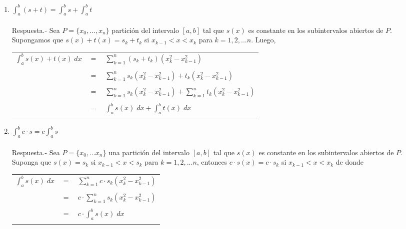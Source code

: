 \begin{enumerate}[ \bfseries 1.]
\begin{enumerate}[\bfseries (a)]
	\item $\displaystyle\int_{a}^{b} (s+t)=\int_{a}^{b} s + \int_{a}^{b} t$\\\\
	    Respuesta.-\; Sea $P=\lbrace x_0,...,x_n \rbrace$ partición del intervalo $[a,b]$ tal que $s(x)$ es constante en los subintervalos abiertos de $P$. Supongamos que $s(x) + t(x) = s_k + t_k$ si $x_{k-1}<x<x_k$ para $k=1,2,...n$. Luego,
	    \begin{center}
		\begin{tabular}{rcl}
		    $\displaystyle\int_{a}^{b} s(x) + t(x) \; dx$&$=$&$\sum\limits_{k=1}^n (s_k + t_k)(x_k^2 - x_{k-1}^2)$\\\\
		    &$=$&$\sum\limits_{k=1}^{n} s_k(x_k^2 - x_{k-1}^2) + t_k(x_k^2 - x_{k-1}^2)$\\\\
		    &$=$&$\sum\limits_{k=1}^{n} s_k(x_k^2 - x_{k-1}^2) + \sum\limits_{k=1}^{n} t_k(x_k^2 - x_{k-1}^2)$\\\\
		    &$=$&$\displaystyle\int_{a}^{b} s(x) \; dx + \int_{a}^{b} t(x) \; dx$\\\\
		\end{tabular}
	    \end{center}

	\item $\displaystyle\int_{a}^{b} c\cdot s = c\int_{a}^{b} s$\\\\
	    Respuesta.-\; Sea $P=\lbrace x_0,...x_n \rbrace$ una partición del intervalo $[a,b]$ tal que $s(x)$ es constante en los subintervalos  abiertos de $P$. Suponga que $s(x)=s_k$ si $x_{k-1} < x< s_{k}$ para $k=1,2,...n$, entonces $c\cdot s(x) = c\cdot s_k$ si $x_{k-1}<x<x_k$ de donde 
	    \begin{center}
		\begin{tabular}{rcl}
		    $\displaystyle\int_{a}^{b} s(x) \; dx$&$=$&$\sum\limits_{k=1}^{n} c\cdot s_k(x_k^2 - x_{k-1}^2)$\\\\
		    &$=$&$c\cdot \sum\limits_{k=1}^{n} s_k(x_k^2 - x_{k-1}^2)$\\\\
		    &$=$&$c\cdot \displaystyle\int_{a}^{b} s(x) \; dx$\\\\
		\end{tabular}
	    \end{center}


\end{enumerate}
\end{enumerate}
